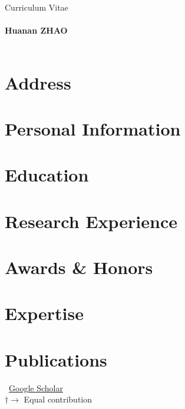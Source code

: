 \documentclass[11pt]{article} %
\newcommand{\mytitle}[1]{
  \begin{center}
    Curriculum Vitae\\
    \hspace{4pt} \\ %
    \Large\textbf{#1}\normalsize \\
    \hspace{4pt} \\ %
  \end{center}
}
\begin{document}
\mytitle{Huanan ZHAO}
\RaggedRight



\section*{Address}


\section*{Personal Information}


\section*{Education}


\section*{Research Experience}
\label{exp_research}


\section*{Awards \& Honors}
\label{awards}


\section*{Expertise}
\label{expertise}




\section*{Publications}
\label{pubs}

\vspace{-.75em}
\small
\faGoogle~\href{https://scholar.google.com/citations?user=ojSVoWQAAAAJ}{Google Scholar}\\
$\dagger \rightarrow$ Equal contribution
\normalsize
\end{document}
